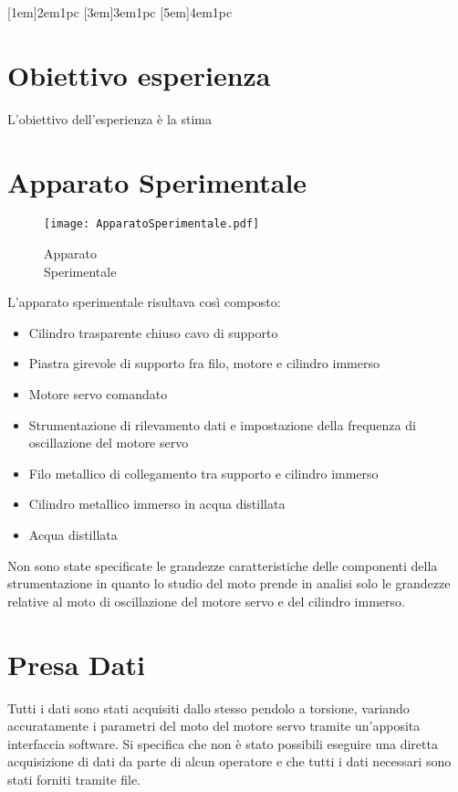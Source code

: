 \documentclass[a4paper,11pt,oneside]{article}
\begin{document}

\clearpage
\tableofcontents
{}
\contentsmargin{6em}
[1em]{\bigskip}{2em}{1pc}
[3em]{\smallskip}{3em}{1pc}
[5em]{\smallskip}{4em}{1pc}


\newpage


\section{Obiettivo esperienza}
L'obiettivo dell'esperienza è la stima

\section{Apparato Sperimentale}


\begin{wrapfigure}[13]{l}{4.5cm}  
    \texttt{[image: ApparatoSperimentale.pdf]}
    \caption{Apparato \\Sperimentale}
    \label{fig:apparato_sperimentale}
\end{wrapfigure}


L'apparato sperimentale risultava così composto:
\begin{itemize}
    \item Cilindro trasparente chiuso cavo di supporto
    \item Piastra girevole di supporto fra filo, motore e cilindro immerso
    \item Motore servo comandato
    \item Strumentazione di rilevamento dati e impostazione della frequenza di oscillazione del motore servo
    \item Filo metallico di collegamento tra supporto e cilindro immerso
    \item Cilindro metallico immerso in acqua distillata
    \item Acqua distillata
\end{itemize}

Non sono state specificate le grandezze caratteristiche delle componenti della strumentazione in quanto lo studio del moto prende in analisi solo le grandezze relative al moto di oscillazione del motore servo e del cilindro immerso.
\section{Presa Dati}
Tutti i dati sono stati acquisiti dallo stesso pendolo a torsione, variando accuratamente i parametri del moto del motore servo tramite un'apposita interfaccia software. Si specifica che non è stato possibili eseguire una diretta acquisizione di dati da parte di alcun operatore e che tutti i dati necessari sono stati forniti tramite file.\newline
\end{document}
